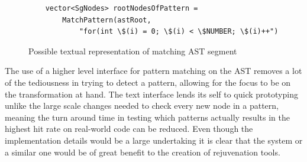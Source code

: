 \documentclass[bsc,frontabs,singlespacing,twoside,parskip,deptreport]{infthesis}
\begin{document}
 \begin{figure}[H]
    \centering
    \begin{verbatim}
    vector<SgNodes> rootNodesOfPattern =
        MatchPattern(astRoot,
            "for(int \$(i) = 0; \$(i) < \$NUMBER; \$(i)++")
    \end{verbatim}
    \caption{Possible textual representation of matching AST segment}
    \label{fig:adv-ast-matching}
\end{figure}

The use of a higher level interface for pattern matching on the AST removes a lot of the tediousness in trying to detect a pattern, allowing for the focus to be on the transformation at hand. The text interface lends its self to quick prototyping unlike the large scale changes needed to check every new node in a pattern, meaning the turn around time in testing which patterns actually results in the highest hit rate on real-world code can be reduced. Even though the implementation details would be a large undertaking it is clear that the system or a similar one would be of great benefit to the creation of rejuvenation tools.

    




\end{document}
